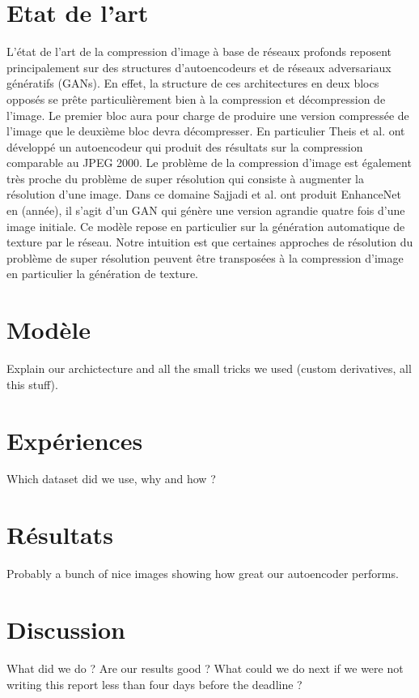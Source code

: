 \documentclass[10pt,twocolumn,letterpaper]{article}
\begin{document}
\section{Etat de l'art}
L'état de l'art de la compression d'image à base de réseaux profonds reposent principalement sur des structures d'autoencodeurs et de réseaux adversariaux génératifs (GANs). En effet, la structure de ces architectures en deux blocs opposés se prête particulièrement bien à la compression et décompression de l'image. Le premier bloc aura pour charge de produire une version compressée de l'image que le deuxième bloc devra décompresser. En particulier Theis et al. ont développé un autoencodeur qui produit des résultats sur la compression comparable au JPEG 2000. Le problème de la compression d'image est également très proche du problème de super résolution qui consiste à augmenter la résolution d'une image. Dans ce domaine Sajjadi et al. ont produit EnhanceNet en (année), il s'agit d'un GAN qui génère une version agrandie quatre fois d'une image initiale. Ce modèle repose en particulier sur la génération automatique de texture par le réseau. Notre intuition est que certaines approches de résolution du problème de super résolution peuvent être transposées à la compression d'image en particulier la génération de texture.

\section{Modèle}

Explain our archictecture and all the small tricks we used (custom derivatives, all this stuff). 

\section{Expériences}

Which dataset did we use, why and how ?

\section{Résultats}

Probably a bunch of nice images showing how great our autoencoder performs.

\section{Discussion} %

What did we do ? Are our results good ? What could we do next if we were not writing this report less than four days before the deadline ?

{\small


}
\end{document}
